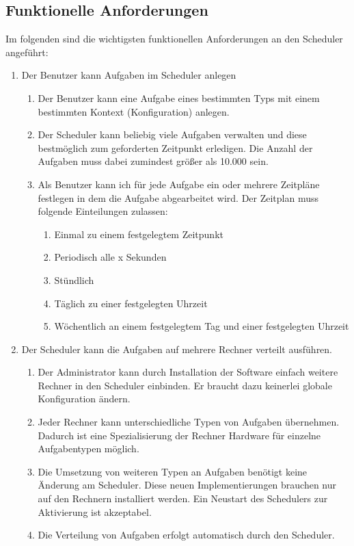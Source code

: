 \subsection{Funktionelle Anforderungen}
Im folgenden sind die wichtigsten funktionellen Anforderungen an den Scheduler angeführt:
\begin{enumerate}
	\item Der Benutzer kann Aufgaben im Scheduler anlegen
	\begin{enumerate}
		\item Der Benutzer kann eine Aufgabe eines bestimmten Typs mit einem bestimmten Kontext (Konfiguration) anlegen.
		\item Der Scheduler kann beliebig viele Aufgaben verwalten und diese bestmöglich zum geforderten Zeitpunkt erledigen. Die Anzahl der Aufgaben muss dabei zumindest größer als 10.000 sein.
		\item Als Benutzer kann ich für jede Aufgabe ein oder mehrere Zeitpläne festlegen in dem die Aufgabe abgearbeitet wird. Der Zeitplan muss folgende Einteilungen zulassen:
		\begin{enumerate}
			\item Einmal zu einem festgelegtem Zeitpunkt
			\item Periodisch alle x Sekunden
			\item Stündlich
			\item Täglich zu einer festgelegten Uhrzeit
			\item Wöchentlich an einem festgelegtem Tag und einer festgelegten Uhrzeit
		\end{enumerate}
	\end{enumerate}
	\item Der Scheduler kann die Aufgaben auf mehrere Rechner verteilt ausführen.
	\begin{enumerate}
		\item Der Administrator kann durch Installation der Software einfach weitere Rechner in den Scheduler einbinden. Er braucht dazu keinerlei globale Konfiguration ändern.
		\item Jeder Rechner kann unterschiedliche Typen von Aufgaben übernehmen. Dadurch ist eine Spezialisierung der Rechner Hardware für einzelne Aufgabentypen möglich.
		\item Die Umsetzung von weiteren Typen an Aufgaben benötigt keine Änderung am Scheduler. Diese neuen Implementierungen brauchen nur auf den Rechnern installiert werden. Ein Neustart des Schedulers zur Aktivierung ist akzeptabel.
		\item Die Verteilung von Aufgaben erfolgt automatisch durch den Scheduler.

\end{enumerate}
\end{enumerate}
